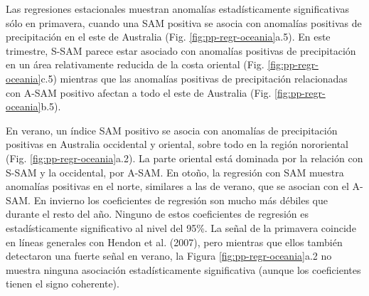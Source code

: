 \documentclass[12pt,oneside]{reedthesis}
\begin{document}
Las regresiones estacionales muestran anomalías estadísticamente significativas sólo en primavera, cuando una SAM positiva se asocia con anomalías positivas de precipitación en el este de Australia (Fig. \ref{fig:pp-regr-oceania}a.5).
En este trimestre, S-SAM parece estar asociado con anomalías positivas de precipitación en un área relativamente reducida de la costa oriental (Fig. \ref{fig:pp-regr-oceania}c.5) mientras que las anomalías positivas de precipitación relacionadas con A-SAM positivo afectan a todo el este de Australia (Fig. \ref{fig:pp-regr-oceania}b.5).

En verano, un índice SAM positivo se asocia con anomalías de precipitación positivas en Australia occidental y oriental, sobre todo en la región nororiental (Fig. \ref{fig:pp-regr-oceania}a.2).
La parte oriental está dominada por la relación con S-SAM y la occidental, por A-SAM.
En otoño, la regresión con SAM muestra anomalías positivas en el norte, similares a las de verano, que se asocian con el A-SAM.
En invierno los coeficientes de regresión son mucho más débiles que durante el resto del año.
Ninguno de estos coeficientes de regresión es estadísticamente significativo al nivel del 95\%.
La señal de la primavera coincide en líneas generales con Hendon et al. (2007), pero mientras que ellos también detectaron una fuerte señal en verano, la Figura \ref{fig:pp-regr-oceania}a.2 no muestra ninguna asociación estadísticamente significativa (aunque los coeficientes tienen el signo coherente).
\end{document}
